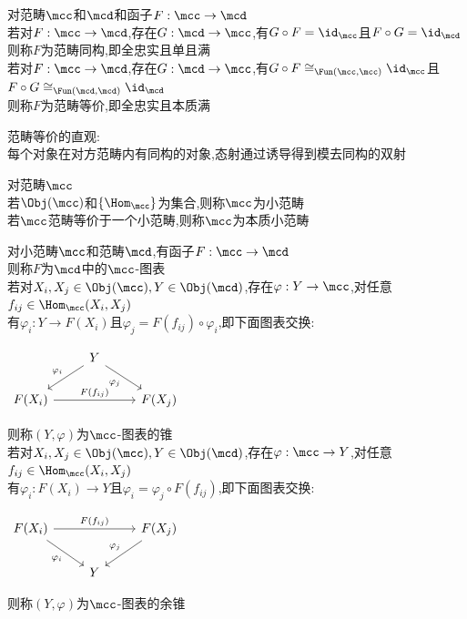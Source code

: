 \begin{dingyi}
对范畴$\mcc$和$\mcd$和函子$F:\mcc\to\mcd$\\
若对$F:\mcc\to\mcd$,存在$G:\mcd\to\mcc$,有$G\circ F=\id_{\mcc}$且$F\circ G=\id_{\mcd}$\\
则称$F$为范畴同构,即全忠实且单且满\\
若对$F:\mcc\to\mcd$,存在$G:\mcd\to\mcc$,有$G\circ F\cong_{\Fun(\mcc,\mcc)}\id_{\mcc}$且$F\circ G\cong_{\Fun(\mcd,\mcd)}\id_{\mcd}$\\
则称$F$为范畴等价,即全忠实且本质满
\end{dingyi}

\begin{zhu}
范畴等价的直观:\\
每个对象在对方范畴内有同构的对象,态射通过诱导得到模去同构的双射
\end{zhu}

\begin{dingyi}
对范畴$\mcc$\\
若$\Obj(\mcc)$和$\{\Hom_{\mcc}\}$为集合,则称$\mcc$为小范畴\\
若$\mcc$范畴等价于一个小范畴,则称$\mcc$为本质小范畴
\end{dingyi}

\begin{dingyi}
对小范畴$\mcc$和范畴$\mcd$,有函子$F:\mcc \to \mcd$\\
则称$F$为$\mcd$中的$\mcc$-图表\\
若对$X_i,X_j\in\Obj(\mcc),Y\in\Obj(\mcd)$,存在$\varphi:Y\to\mcc$,对任意$f_{ij}\in\Hom_{\mcc}(X_i,X_j)$\\
有$\varphi_{i}:Y\to F(X_{i})$且$\varphi_{j}=F(f_{ij})\circ\varphi_{i}$,即下面图表交换:
\begin{center}
    $\begin{tikzcd}
    & Y \ar[dl,"\varphi_{i}"'] \ar[dr,"\varphi_{j}"'] & \\
    F(X_i) \ar[rr,"F(f_{ij})"] & & F(X_j)
    \end{tikzcd}$
\end{center}
则称$(Y,\varphi)$为$\mcc$-图表的锥\\
若对$X_i,X_j\in\Obj(\mcc),Y\in\Obj(\mcd)$,存在$\varphi:\mcc\to Y$,对任意$f_{ij}\in\Hom_{\mcc}(X_i,X_j)$\\
有$\varphi_{i}:F(X_{i})\to Y$且$\varphi_{i}=\varphi_{j}\circ F(f_{ij})$,即下面图表交换:
\begin{center}
    $\begin{tikzcd}
    F(X_i) \ar[rr,"F(f_{ij})"] \ar[dr,"\varphi_{i}"'] & & F(X_j) \ar[dl,"\varphi_{j}"'] \\
    & Y &
    \end{tikzcd}$
\end{center}
则称$(Y,\varphi)$为$\mcc$-图表的余锥
\end{dingyi}


